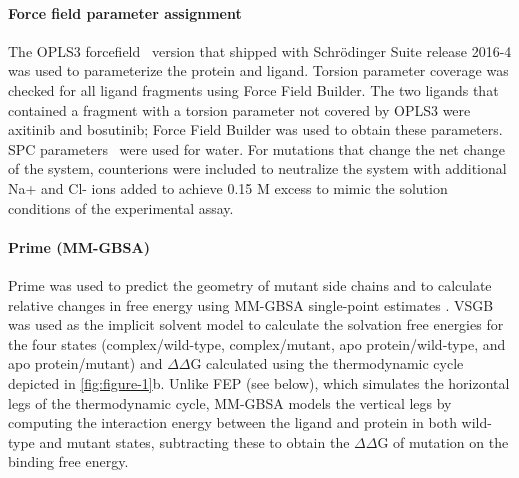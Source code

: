 \documentclass[phd,tocprelim]{cornell}
\renewcommand{\FIG}[1]{\autoref{fig:#1}}
\begin{document}
\paragraph{Force field parameter assignment}
The OPLS3 forcefield~\citep{Harder:J.Chem.TheoryComput.:2016} version that shipped with Schr\"{o}dinger Suite release 2016-4 was used to parameterize the protein and ligand.
Torsion parameter coverage was checked for all ligand fragments using Force Field Builder. 
The two ligands that contained a fragment with a torsion parameter not covered by OPLS3 were axitinib and bosutinib; Force Field Builder was used to obtain these parameters. 
SPC parameters~\citep{Berendsen:IntermolecularForces:1981} were used for water. For mutations that change the net change of the system, counterions were included to neutralize the system with additional Na+ and Cl- ions added to achieve 0.15 M excess to mimic the solution conditions of the experimental assay.

\paragraph{Prime (MM-GBSA)}
Prime was used to predict the geometry of mutant side chains and to calculate relative changes in free energy using MM-GBSA single-point estimates \citep{Rapp:J.Chem.Inf.Model.:2011}. VSGB \citep{Shivakumar:J.Chem.TheoryComput.:2010} was used as the implicit solvent model to calculate the solvation free energies for the four states (complex/wild-type, complex/mutant, apo protein/wild-type, and apo protein/mutant) and $\Delta\Delta$G calculated using the thermodynamic cycle depicted in \FIG{figure-1}b. 
Unlike FEP (see below), which simulates the horizontal legs of the thermodynamic cycle, MM-GBSA models the vertical legs by computing the interaction energy between the ligand and protein in both wild-type and mutant states, subtracting these to obtain the $\Delta\Delta$G of mutation on the binding free energy.
\end{document}

